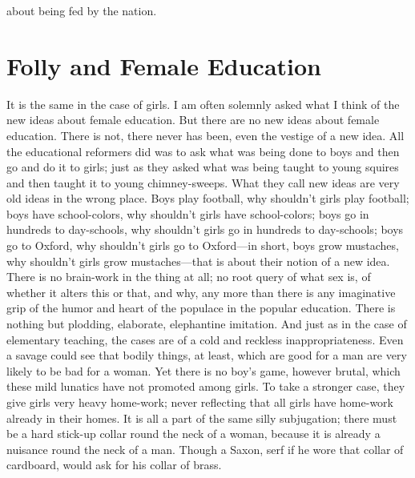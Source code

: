 \documentclass{book}
\begin{document}
about being fed by the nation.

\chapter{Folly and Female Education}
\label{chapter-45}
It is the same in the case of girls. I am often solemnly asked what I think of the new ideas about female education. But there are no new ideas about female education. There is not, there never has been, even the vestige of a new idea. All the educational reformers did was to ask what was being done to boys and then go and do it to girls; just as they asked what was being taught to young squires and then taught it to young chimney-sweeps. What they call new ideas are very old ideas in the wrong place. Boys play football, why shouldn’t girls play football; boys have school-colors, why shouldn’t girls have school-colors; boys go in hundreds to day-schools, why shouldn’t girls go in hundreds to day-schools; boys go to Oxford, why shouldn’t girls go to Oxford—in short, boys grow mustaches, why shouldn’t girls grow mustaches—that is about their notion of a new idea. There is no brain-work in the thing at all; no root query of what sex is, of whether it alters this or that, and why, any more than there is any imaginative grip of the humor and heart of the populace in the popular education. There is nothing but plodding, elaborate, elephantine imitation. And just as in the case of elementary teaching, the cases are of a cold and reckless inappropriateness. Even a savage could see that bodily things, at least, which are good for a man are very likely to be bad for a woman. Yet there is no boy’s game, however brutal, which these mild lunatics have not promoted among girls. To take a stronger case, they give girls very heavy home-work; never reflecting that all girls have home-work already in their homes. It is all a part of the same silly subjugation; there must be a hard stick-up collar round the neck of a woman, because it is already a nuisance round the neck of a man. Though a Saxon, serf if he wore that collar of cardboard, would ask for his collar of brass.
\end{document}
